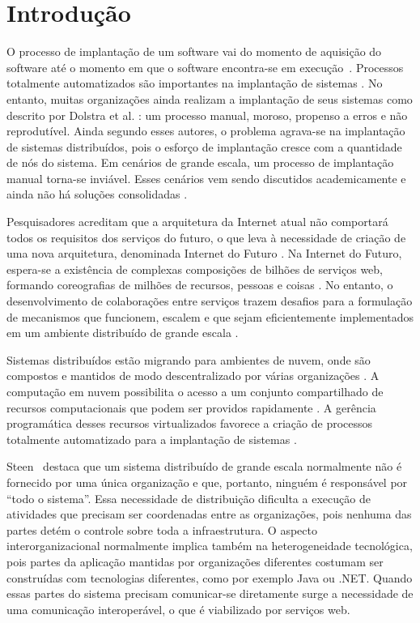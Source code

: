 \chapter{Introdução}
\label{cap:introducao}

O processo de implantação de um software vai do momento de aquisição do software até o momento em que o software encontra-se em execução~\cite{DEPL2006}. Processos totalmente automatizados são importantes na implantação de sistemas \cite{Humble2011Continuous}. No entanto, muitas organizações ainda realizam a implantação de seus sistemas como descrito por Dolstra et al. \cite{Dolstra2005Configuration}: um processo manual, moroso, propenso a erros e não reprodutível. Ainda segundo esses autores, o problema agrava-se na implantação de sistemas distribuídos, pois o esforço de implantação cresce com a quantidade de nós do sistema. Em cenários de grande escala, um processo de implantação manual torna-se inviável. Esses cenários vem sendo discutidos academicamente e ainda não há soluções consolidadas \cite{Valerie2011FutureInternet}.

Pesquisadores acreditam que a arquitetura da Internet atual não comportará todos os requisitos dos serviços do futuro, o que leva à necessidade de criação de uma nova arquitetura, denominada Internet do Futuro \cite{Zahariadis2011FutureInternet}. Na Internet do Futuro, espera-se a existência de complexas composições de bilhões de serviços web, formando coreografias de milhões de recursos, pessoas e coisas \cite{Valerie2011FutureInternet}. No entanto, o desenvolvimento de colaborações entre serviços trazem desafios para a formulação de mecanismos que funcionem, escalem e que sejam eficientemente implementados em um ambiente distribuído de grande escala \cite{Steen2011VeryLarge}.

Sistemas distribuídos estão migrando para ambientes de nuvem, onde são compostos e mantidos de modo descentralizado por várias organizações \cite{Steen2011VeryLarge}. A computação em nuvem possibilita o acesso a um conjunto compartilhado de recursos computacionais que podem ser providos rapidamente \cite{Nist2011Cloud}. A gerência programática desses recursos virtualizados favorece a criação de processos totalmente automatizado para a implantação de sistemas \cite{Humble2011Continuous}.   

Steen~\cite{Steen2011VeryLarge} destaca que um sistema distribuído de grande escala normalmente não é fornecido por uma única organização e que, portanto, ninguém é responsável por ``todo o sistema''. Essa necessidade de distribuição dificulta a execução de atividades que precisam ser coordenadas entre as organizações, pois nenhuma das partes detém o controle sobre toda a infraestrutura. O aspecto interorganizacional normalmente implica também na heterogeneidade tecnológica, pois partes da aplicação mantidas por organizações diferentes costumam ser construídas com tecnologias diferentes, como por exemplo Java ou .NET. Quando essas partes do sistema precisam comunicar-se diretamente surge a necessidade de uma comunicação interoperável, o que é viabilizado por serviços web. 

